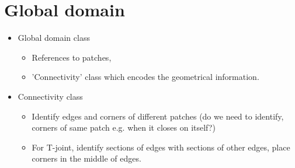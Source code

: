 \documentclass[presentation.tex]{subfiles}
\begin{document}
\section{Global domain}
\begin{itemize}
    \item Global domain class
    \begin{itemize}
        \item References to patches,
        \item 'Connectivity' class which encodes the geometrical information.
    \end{itemize}
    \item Connectivity class
    \begin{itemize}
        \item Identify edges and corners of different patches (do we need to identify,
                corners of same patch e.g. when it closes on itself?)
        \item For T-joint, identify sections of edges with sections of other edges, 
                place corners in the middle of edges.
    \end{itemize}
    
\end{itemize}
\end{document}
